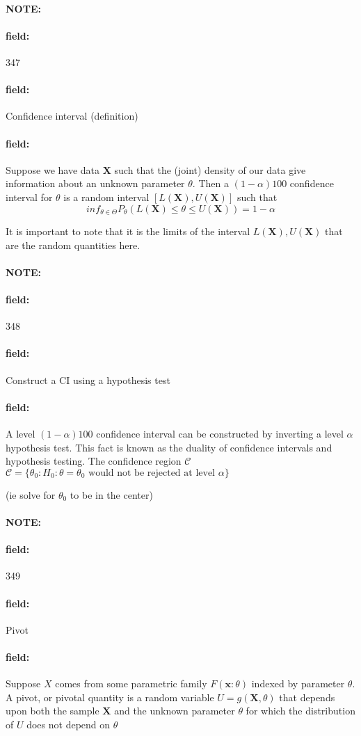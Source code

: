 \documentclass[12pt]{article}
\newenvironment{note}{\paragraph{NOTE:}}{}
\newenvironment{field}{\paragraph{field:}}{}
\begin{document}
\begin{note}
    \begin{field}
        \tiny 347
    \end{field}
    \begin{field}
        Confidence interval (definition)
    \end{field}
    \begin{field}
        Suppose we have data $\mathbf{X}$ such that the (joint) density of our data give information about an unknown parameter $\theta$. Then a $(1-\alpha)100$ confidence interval for $\theta$ is a random interval $[L(\mathbf{X}),U(\mathbf{X})]$ such that $$ inf_{\theta\in\Theta}P_\theta(L(\mathbf{X})\leq \theta \leq U(\mathbf{X})) = 1 - \alpha $$

        It is important to note that it is the limits of the interval $L(\mathbf{X}), U(\mathbf{X})$ that are the random quantities here.
    \end{field}
\end{note}




\begin{note}
    \begin{field}
        \tiny 348
    \end{field}
    \begin{field}
        Construct a CI using a hypothesis test
    \end{field}
    \begin{field}
        A level $(1-\alpha)100$ confidence interval can be constructed by inverting a level $\alpha$ hypothesis test. This fact is known as the duality of confidence intervals and hypothesis testing.
        The confidence region $\mathscr{C}$ $\mathscr{C} = \{\theta_0: H_0: \theta = \theta_0 \text{ would not be rejected at level } \alpha \}$

        (ie solve for $\theta_0$ to be in the center)
    \end{field}
\end{note}


\begin{note}
    \begin{field}
        \tiny 349
    \end{field}
    \begin{field}
        Pivot
    \end{field}
    \begin{field}
        Suppose $X$ comes from some parametric family $F(\mathbf{x}:\theta)$ indexed by parameter $\theta$. A pivot, or pivotal quantity is a random variable $U = g(\mathbf{X},\theta)$ that depends upon both the sample $\mathbf{X}$ and the unknown parameter $\theta$ for which the distribution of $U$ does not depend on $\theta$
    \end{field}
\end{note}
\end{document}
